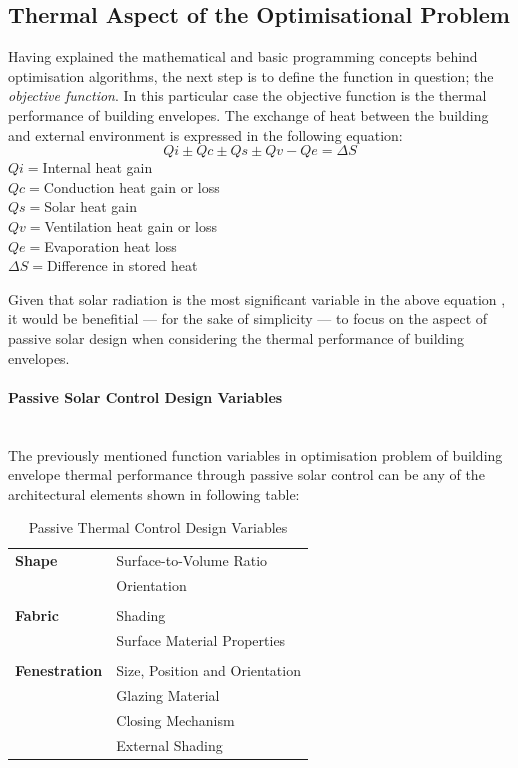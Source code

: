 \documentclass[11pt,a4paper,oneside]{article}
\begin{document}
\begin{multicols}{2}

\section{Thermal Aspect of the Optimisational Problem}

Having explained the mathematical and basic programming concepts behind optimisation algorithms, the next step is to define the function in question; the \emph{objective function}. In this particular case the objective function is the thermal performance of building envelopes. The exchange of heat between the building and external environment is expressed in the following equation:
\begin{equation}
	Qi\pm Qc\pm Qs\pm Qv-Qe=\Delta S
\end{equation}
\footnotesize
\indent$Qi=$Internal heat gain\\
\indent$Qc=$Conduction heat gain or loss\\
\indent$Qs=$Solar heat gain\\
\indent$Qv=$Ventilation heat gain or loss\\
\indent$Qe=$Evaporation heat loss\\
\indent$\Delta S=$Difference in stored heat
\normalsize

Given that solar radiation is the most significant variable in the above equation \cite{szokolay08}, it would be benefitial --- for the sake of simplicity --- to focus on the aspect of passive solar design when considering the thermal performance of building envelopes.

\paragraph{Passive Solar Control Design Variables}\mbox{}\\

The previously mentioned function variables in optimisation problem of building envelope thermal performance through passive solar control can be any of the architectural elements shown in following table:

\begin{table}[H]
	\centering
	\begin{tabular}{l|l}
		\textbf{Shape}&Surface-to-Volume Ratio\\
		&Orientation\\
		&\\
		\textbf{Fabric}&Shading\\
		&Surface Material Properties\\
		&\\
		\textbf{Fenestration}&Size, Position and Orientation\\
		&Glazing Material\\
		&Closing Mechanism\\
		&External Shading\\
	\end{tabular}
	\caption{Passive Thermal Control Design Variables}
	\label{tab:ThermalDesignVariables}
\end{table}


\end{multicols}
\end{document}
